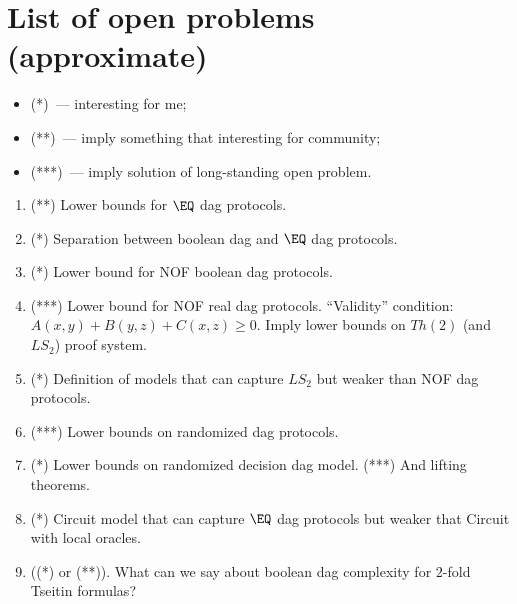 \section{List of open problems (approximate)}

\begin{itemize}
    \item (*)~--- interesting for me;
    \item (**)~--- imply something that interesting for community;
    \item (***)~--- imply solution of long-standing open problem.
\end{itemize}


\begin{enumerate}
    \item (**) Lower bounds for $\EQ$ dag protocols.
    \item (*) Separation between boolean dag and $\EQ$ dag protocols.
    \item (*) Lower bound for NOF boolean dag protocols.
    \item (***) Lower bound for NOF real dag protocols. ``Validity'' condition: $A(x, y) + B(y, z) +
        C(x, z) \ge 0$. Imply lower bounds on $Th(2)$ (and $LS_2$) proof system.
    \item (*) Definition of models that can capture $LS_2$ but weaker than NOF dag protocols.
    \item (***) Lower bounds on randomized dag protocols.
    \item (*) Lower bounds on randomized decision dag model. (***) And lifting theorems. 
    \item (*) Circuit model that can capture $\EQ$ dag protocols but weaker that Circuit with local
        oracles.
    \item ((*) or (**)). What can we say about boolean dag complexity for $2$-fold Tseitin formulas?
\end{enumerate}